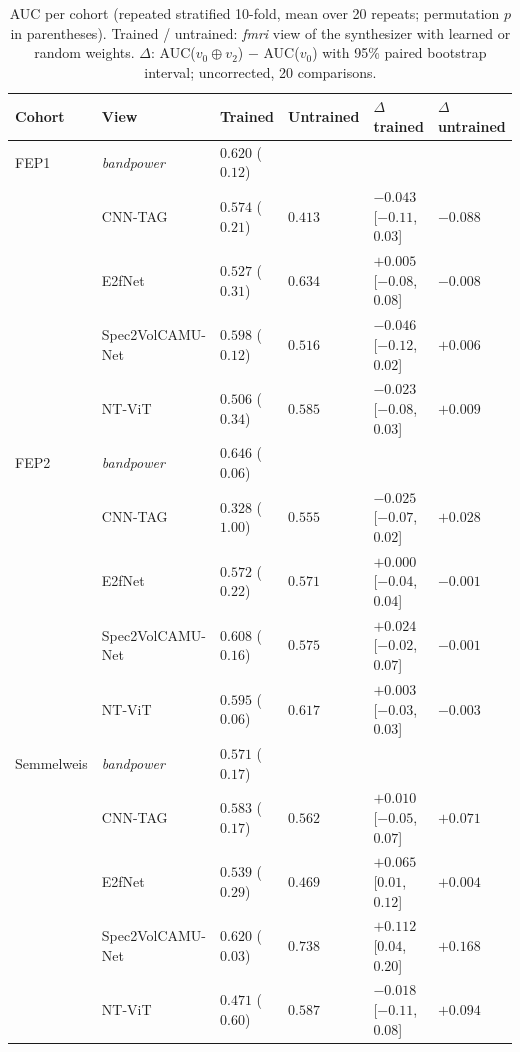\documentclass{article}
\begin{document}
\begin{table}[t]
    \centering
    \caption{AUC per cohort (repeated stratified 10-fold, mean over 20 repeats; permutation $p$ in parentheses). Trained / untrained: \textit{fmri} view of the synthesizer with learned or random weights. $\Delta$: AUC($v_0\oplus v_2$) $-$ AUC($v_0$) with 95\% paired bootstrap interval; uncorrected, 20 comparisons.}
    \label{tab:clf}
    \small
    \begin{tabular}{ p{1.8cm} | p{3.2cm} | p{1.8cm} | p{1.2cm} | p{3.0cm} | p{1.6cm}}
        \hline
        \hline
        \hfil Cohort & \hfil View & \hfil Trained & \hfil Untrained & \hfil $\Delta$ trained & \hfil $\Delta$ untrained\\
        \hline
        FEP1 & \textit{bandpower} & $0.620$ ($0.12$) & & & \\
         & CNN-TAG & $0.574$ ($0.21$) & $0.413$ & $-0.043$ [$-0.11$, $0.03$] & $-0.088$ \\
         & E2fNet & $0.527$ ($0.31$) & $0.634$ & $+0.005$ [$-0.08$, $0.08$] & $-0.008$ \\
         & Spec2VolCAMU-Net & $0.598$ ($0.12$) & $0.516$ & $-0.046$ [$-0.12$, $0.02$] & $+0.006$ \\
         & NT-ViT & $0.506$ ($0.34$) & $0.585$ & $-0.023$ [$-0.08$, $0.03$] & $+0.009$ \\
        \hline
        FEP2 & \textit{bandpower} & $0.646$ ($0.06$) & & & \\
         & CNN-TAG & $0.328$ ($1.00$) & $0.555$ & $-0.025$ [$-0.07$, $0.02$] & $+0.028$ \\
         & E2fNet & $0.572$ ($0.22$) & $0.571$ & $+0.000$ [$-0.04$, $0.04$] & $-0.001$ \\
         & Spec2VolCAMU-Net & $0.608$ ($0.16$) & $0.575$ & $+0.024$ [$-0.02$, $0.07$] & $-0.001$ \\
         & NT-ViT & $0.595$ ($0.06$) & $0.617$ & $+0.003$ [$-0.03$, $0.03$] & $-0.003$ \\
        \hline
        Semmelweis & \textit{bandpower} & $0.571$ ($0.17$) & & & \\
         & CNN-TAG & $0.583$ ($0.17$) & $0.562$ & $+0.010$ [$-0.05$, $0.07$] & $+0.071$ \\
         & E2fNet & $0.539$ ($0.29$) & $0.469$ & $+0.065$ [$0.01$, $0.12$] & $+0.004$ \\
         & Spec2VolCAMU-Net & $0.620$ ($0.03$) & $0.738$ & $+0.112$ [$0.04$, $0.20$] & $+0.168$ \\
         & NT-ViT & $0.471$ ($0.60$) & $0.587$ & $-0.018$ [$-0.11$, $0.08$] & $+0.094$ \\

\end{tabular}
\end{table}
\end{document}
